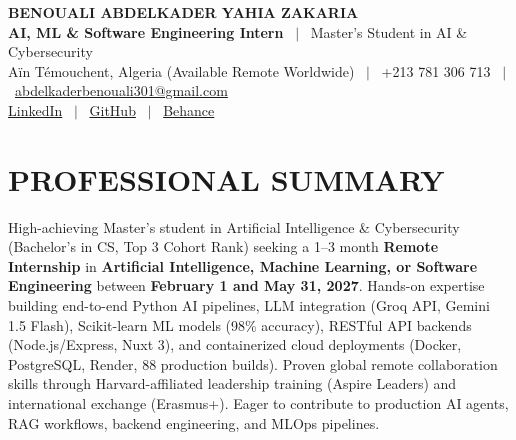 \documentclass[10pt, letterpaper]{article}
\begin{document}
\RaggedRight

\begin{center}
  {\Huge \textbf{BENOUALI ABDELKADER YAHIA ZAKARIA}}\\[3pt]
  {\large \textbf{AI, ML \& Software Engineering Intern} \ $|$ \ Master's Student in AI \& Cybersecurity}\\[3pt]
  Aïn Témouchent, Algeria (Available Remote Worldwide) \ $|$ \ +213 781 306 713 \ $|$ \ \href{mailto:abdelkaderbenouali301@gmail.com}{abdelkaderbenouali301@gmail.com}\\[2pt]
  \href{https://www.linkedin.com/in/benouali-abdelkader-yahia-zakaria-4a917a247}{LinkedIn} \ $|$ \ \href{https://github.com/benoualiabdelkader}{GitHub} \ $|$ \ \href{https://www.behance.net/abdelkaderbeno}{Behance}
\end{center}

\vspace{-2pt}

\section{PROFESSIONAL SUMMARY}
High-achieving Master's student in Artificial Intelligence \& Cybersecurity (Bachelor's in CS, Top 3 Cohort Rank) seeking a 1--3 month \textbf{Remote Internship} in \textbf{Artificial Intelligence, Machine Learning, or Software Engineering} between \textbf{February 1 and May 31, 2027}. Hands-on expertise building end-to-end Python AI pipelines, LLM integration (Groq API, Gemini 1.5 Flash), Scikit-learn ML models (98\% accuracy), RESTful API backends (Node.js/Express, Nuxt 3), and containerized cloud deployments (Docker, PostgreSQL, Render, 88 production builds). Proven global remote collaboration skills through Harvard-affiliated leadership training (Aspire Leaders) and international exchange (Erasmus+). Eager to contribute to production AI agents, RAG workflows, backend engineering, and MLOps pipelines.

\end{document}
